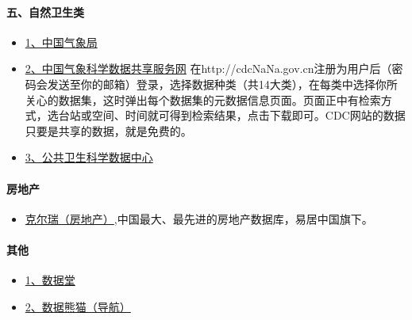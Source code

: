\documentclass[letterpaper,10pt,english]{sphinxmanual}
\begin{document}
\paragraph{五、自然卫生类}
\label{opendatasource:}\label{opendatasource:id11}\begin{itemize}
\item {} 
\href{http://wwwNaNa.gov.cn/2011qxfw/2011qsjcx/}{1、中国气象局}

\item {} 
\href{http://cdcNaNa.gov.cn/home.do}{2、中国气象科学数据共享服务网}
在http://cdcNaNa.gov.cn注册为用户后（密码会发送至你的邮箱）登录，选择数据种类（共14大类），在每类中选择你所关心的数据集，这时弹出每个数据集的元数据信息页面。页面正中有检索方式，选台站或空间、时间就可得到检索结果，点击下载即可。CDC网站的数据只要是共享的数据，就是免费的。

\item {} 
\href{http://www.phsciencedata.cn/Share/index.jsp}{3、公共卫生科学数据中心}

\end{itemize}


\paragraph{房地产}
\label{opendatasource:}\label{opendatasource:id12}\begin{itemize}
\item {} 
\href{http://www.cricchina.com/Data/DataPage/DataPageIndex}{克尔瑞（房地产）},中国最大、最先进的房地产数据库，易居中国旗下。

\end{itemize}


\paragraph{其他}
\label{opendatasource:}\label{opendatasource:id13}\begin{itemize}
\item {} 
\href{http://datatang.com/}{1、数据堂}

\item {} 
\href{http://www.datapanda.net/123/}{2、数据熊猫（导航）}

\end{itemize}
\end{document}
